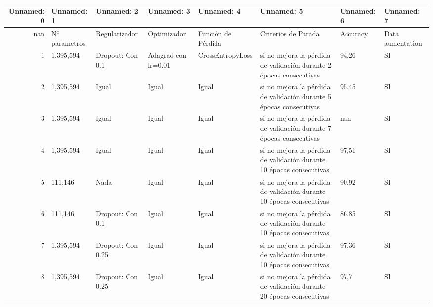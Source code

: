 \begin{tabular}{rlllllll}
\hline
   Unnamed: 0 & Unnamed: 1    & Unnamed: 2        & Unnamed: 3                              & Unnamed: 4         & Unnamed: 5                                                           & Unnamed: 6   & Unnamed: 7       \\
\hline
          nan & Nº parametros & Regularizador     & Optimizador                             & Función de Pérdida & Criterios de Parada                                                  & Accuracy     & Data aumentation \\
            1 & 1,395,594     & Dropout: Con 0.1  & Adagrad con lr=0.01                     & CrossEntropyLoss   & si no mejora la pérdida de validación durante 2 épocas consecutivas  & 94.26        & SI               \\
            2 & 1,395,594     & Igual             & Igual                                   & Igual              & si no mejora la pérdida de validación durante 5 épocas consecutivas  & 95.45        & SI               \\
            3 & 1,395,594     & Igual             & Igual                                   & Igual              & si no mejora la pérdida de validación durante 7 épocas consecutivas  & nan          & SI               \\
            4 & 1,395,594     & Igual             & Igual                                   & Igual              & si no mejora la pérdida de validación durante 10 épocas consecutivas & 97,51        & SI               \\
            5 & 111,146       & Nada              & Igual                                   & Igual              & si no mejora la pérdida de validación durante 10 épocas consecutivas & 90.92        & SI               \\
            6 & 111,146       & Dropout: Con 0.1  & Igual                                   & Igual              & si no mejora la pérdida de validación durante 10 épocas consecutivas & 86.85        & SI               \\
            7 & 1,395,594     & Dropout: Con 0.25 & Igual                                   & Igual              & si no mejora la pérdida de validación durante 10 épocas consecutivas & 97,36        & SI               \\
            8 & 1,395,594     & Dropout: Con 0.25 & Igual                                   & Igual              & si no mejora la pérdida de validación durante 20 épocas consecutivas & 97,7         & SI               \\

\end{tabular}
